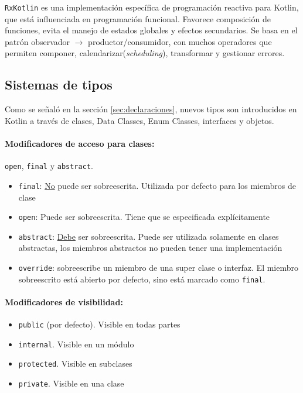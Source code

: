 \texttt{RxKotlin} es una implementación específica de programación reactiva para Kotlin, que está influenciada en programación funcional. Favorece composición de funciones, evita el manejo de estados globales y efectos secundarios. Se basa en el patrón observador $\rightarrow$ productor/consumidor, con muchos operadores que permiten componer, calendarizar(\emph{scheduling}), transformar y gestionar errores.
 

\subsection{Sistemas de tipos} \label{sec:tipos}
Como se señaló en la sección \ref{sec:declaraciones}, nuevos tipos son introducidos en Kotlin a través de clases, Data Classes, Enum Classes, interfaces y objetos. 

\paragraph{Modificadores de acceso para clases:} \texttt{open}, \texttt{final} y \texttt{abstract}. 
\begin{itemize}
    \item \texttt{final}: \underline{No} puede ser sobreescrita. Utilizada por defecto para los miembros de clase
    \item \texttt{open}: Puede ser sobreescrita. Tiene que se especificada explícitamente
    \item \texttt{abstract}: \underline{Debe} ser sobreescrita. Puede ser utilizada solamente en clases abstractas, los miembros abstractos no pueden tener una implementación
    \item \texttt{override}: sobreescribe un miembro de una super clase o interfaz. El miembro sobreescrito está abierto por defecto, sino está marcado como \texttt{final}. 
\end{itemize}

\paragraph{Modificadores de visibilidad:} 
\begin{itemize}
    \item \texttt{public} (por defecto). Visible en todas partes
    \item \texttt{internal}. Visible en un módulo
    \item \texttt{protected}. Visible en subclases
    \item \texttt{private}. Visible en una clase
\end{itemize}

